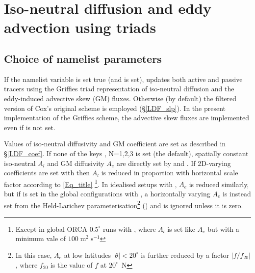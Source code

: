 \documentclass[NEMO_book]{subfiles}
\begin{document}
\chapter[Iso-neutral diffusion and eddy advection using
triads]{Iso-neutral diffusion and eddy advection using triads}
\label{sec:triad}
\minitoc
\pagebreak
\section{Choice of  namelist parameters}
If the namelist variable  is set true (and
 is set), \NEMO updates both active and passive tracers
using the Griffies triad representation of iso-neutral diffusion and
the eddy-induced advective skew (GM) fluxes. Otherwise (by default) the
filtered version of Cox's original scheme is employed
(\S\ref{LDF_slp}). In the present implementation of the Griffies
scheme, the advective skew fluxes are implemented even if
 is not set.

Values of iso-neutral diffusivity and GM coefficient are set as
described in \S\ref{LDF_coef}. If none of the keys ,
N=1,2,3 is set (the default), spatially constant iso-neutral $A_l$ and
GM diffusivity $A_e$ are directly set by  and
. If 2D-varying coefficients are set with
 then $A_l$ is reduced in proportion with horizontal
scale factor according to \eqref{Eq_title} \footnote{Except in global ORCA
  $0.5^{\circ}$ runs with , where
  $A_l$ is set like $A_e$ but with a minimum vale of
  $100\;\mathrm{m}^2\;\mathrm{s}^{-1}$}. In idealised setups with
, $A_e$ is reduced similarly, but if 
is set in the global configurations with , a horizontally varying $A_e$ is
instead set from the Held-Larichev parameterisation\footnote{In this
  case, $A_e$ at low latitudes $|\theta|<20^{\circ}$ is further
  reduced by a factor $|f/f_{20}|$, where $f_{20}$ is the value of $f$
  at $20^{\circ}$~N} () and  is ignored
unless it is zero.
\end{document}
